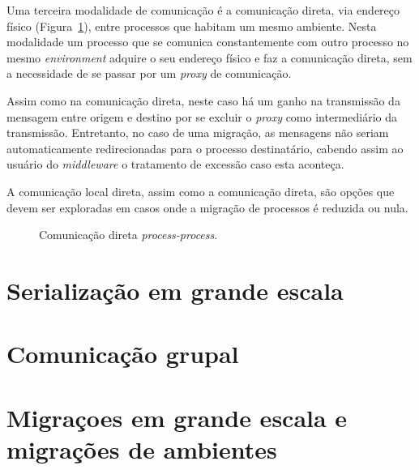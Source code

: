 Uma terceira modalidade de comunicação é a comunicação direta, via endereço físico (Figura~\ref{fig:direta_mesmo}), entre processos que habitam um mesmo ambiente. Nesta modalidade um processo que se comunica constantemente com outro processo no mesmo \textit{environment} adquire o seu endereço físico e faz a comunicação direta, sem a necessidade de se passar por um \textit{proxy} de comunicação.

Assim como na comunicação direta, neste caso há um ganho na transmissão da mensagem entre origem e destino por se excluir o \textit{proxy} como intermediário da transmissão. Entretanto, no caso de uma migração, as mensagens não seriam automaticamente redirecionadas para o processo destinatário, cabendo assim ao usuário do \textit{middleware} o tratamento de excessão caso esta aconteça.

A comunicação local direta, assim como a comunicação direta, são opções que devem ser exploradas em casos onde a migração de processos é reduzida ou nula.

\begin{figure}
  \caption{Comunicação direta \textit{process-process}.}
\label{fig:direta_mesmo}
\end{figure}

\section{Serialização em grande escala} %
\section{Comunicação grupal} %
\section{Migraçoes em grande escala e migrações de ambientes \label{migra_ambiente}} %
